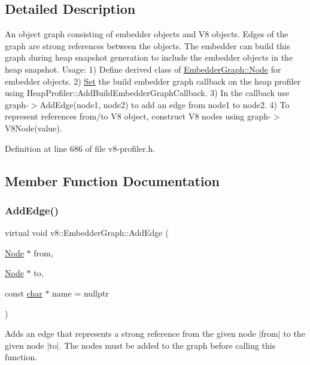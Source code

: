 \subsection{Detailed Description}
An object graph consisting of embedder objects and V8 objects. Edges of the graph are strong references between the objects. The embedder can build this graph during heap snapshot generation to include the embedder objects in the heap snapshot. Usage\+: 1) Define derived class of \mbox{\hyperlink{classv8_1_1EmbedderGraph_1_1Node}{Embedder\+Graph\+::\+Node}} for embedder objects. 2) \mbox{\hyperlink{classv8_1_1Set}{Set}} the build embedder graph callback on the heap profiler using Heap\+Profiler\+::\+Add\+Build\+Embedder\+Graph\+Callback. 3) In the callback use graph-\/$>$Add\+Edge(node1, node2) to add an edge from node1 to node2. 4) To represent references from/to V8 object, construct V8 nodes using graph-\/$>$V8\+Node(value). 

Definition at line 686 of file v8-\/profiler.\+h.



\subsection{Member Function Documentation}
\mbox{\label{classv8_1_1EmbedderGraph_a81b1c7dd4d0387ec50037b0778b8af11}} 
\subsubsection{\texorpdfstring{Add\+Edge()}{AddEdge()}}
{\footnotesize\ttfamily virtual void v8\+::\+Embedder\+Graph\+::\+Add\+Edge (\begin{DoxyParamCaption}\item[{\mbox{\hyperlink{classv8_1_1EmbedderGraph_1_1Node}{Node}} $\ast$}]{from,  }\item[{\mbox{\hyperlink{classv8_1_1EmbedderGraph_1_1Node}{Node}} $\ast$}]{to,  }\item[{const \mbox{\hyperlink{classchar}{char}} $\ast$}]{name = {\ttfamily nullptr} }\end{DoxyParamCaption})\hspace{0.3cm}{\ttfamily [pure virtual]}}

Adds an edge that represents a strong reference from the given node $\vert$from$\vert$ to the given node $\vert$to$\vert$. The nodes must be added to the graph before calling this function.

